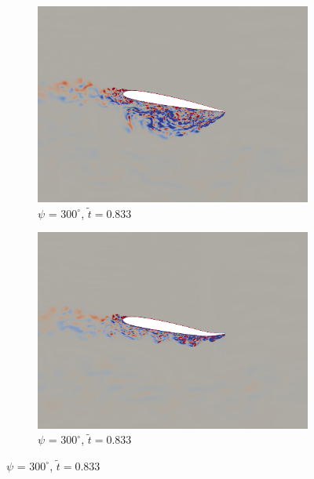 \begin{figure}[H]\ContinuedFloat
\centering
	\begin{subfigure}[b]{0.4\textwidth}
		\centering
		\includegraphics[width=1\textwidth]{figures/SC1095/baseline/phase_300.png}
		\caption{ $\psi$ = $300^\circ$, $\tilde{t}=0.833$}
		\label{fig:SC1095_baseline_psi300}
	\end{subfigure}
	\begin{subfigure}[b]{0.4\textwidth}
		\centering
		\includegraphics[width=1\textwidth]{figures/SC1095/AC/phase_300.png}
		\caption{ $\psi$ = $300^\circ$, $\tilde{t}=0.833$}
		\label{fig:SC1095_AC_psi300}
	\end{subfigure}
	

\end{figure}
